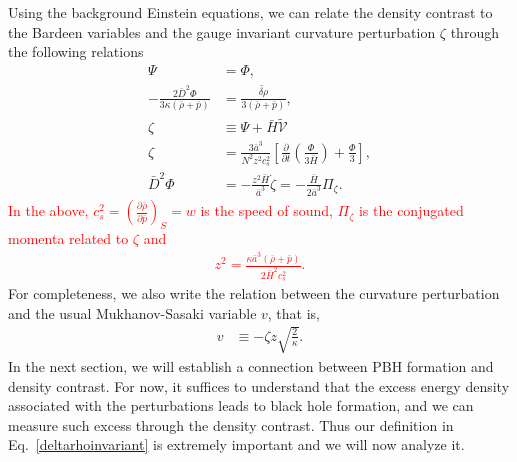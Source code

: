 \documentclass[a4paper,11pt]{article}
\newcommand{\dpar}[1]{\left(#1 \right)}
\begin{document}
Using the background Einstein equations, we can relate the density contrast to the
Bardeen variables and the gauge invariant curvature perturbation $\zeta$ through the
following relations~\cite{Mukhanov1992, Vitenti2013}
\begin{align}
	\Psi                                                    & =\Phi,
	\\
	\label{deltarho}
	-\frac{2\bar{D}^2 \Phi}{3  \kappa (\bar{\rho}+\bar{p})} & =   \frac{{\tilde{\delta\rho}}} {3(\bar{\rho}+\bar{p})}
	,
	\\
	\label{vrelation}
	\zeta                                                   & \equiv \Psi  + \bar{H} \tilde{\mathcal{V}}
	\\
	\label{zeta2}
	\zeta                                                   & = \frac{3  \bar{a}^3}{N^2z^2 c_s^2 } \left[\frac{\partial}{\partial t}\left(\frac{\Phi }{3\bar{H}}\right) + \frac{\Phi}{3}\right]
	,                                                                                                                                                                                            \\
	\label{phiz}
	\bar{D}^{2} \Phi                                        & =  - \frac{z^2\bar{H}}{\bar{a}^3} \dot{\zeta} = -\frac{\bar{H}}{2\bar{a}^3} \Pi_\zeta
	.\end{align}
\textcolor{red}{In the above, $c^{2}_s=\dpar{ \frac{\partial\bar{\rho}}{\partial\bar{p}} }_{S}= w$ is the speed of sound, $\Pi_\zeta$ is the conjugated momenta related to $\zeta$ and
	\begin{align}
		\label{zdef}
		z^2=\frac{\kappa \bar{a}^3 (\bar{\rho} + \bar{p})}{2\bar{H}^2 c_{s}^2}
		.\end{align}}
For completeness, we also write the relation between the curvature perturbation and the
usual Mukhanov-Sasaki variable $v$, that is,
\begin{align}
	\label{msv}
	v & \equiv - \zeta z \sqrt{\frac{2}{\kappa}}
	.\end{align}
In the next section, we will establish a connection between PBH formation and density contrast. For now, it suffices to understand that the excess energy density associated with the perturbations leads to black hole formation, and we can measure such excess through the density contrast. Thus our definition in Eq.~\eqref{deltarhoinvariant} is extremely important and we will now analyze it.
\end{document}

